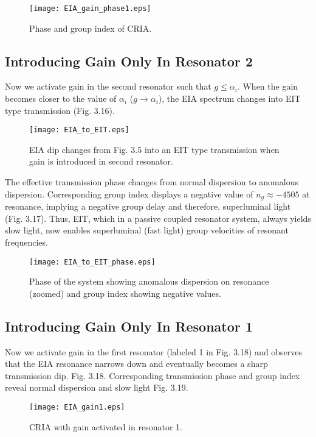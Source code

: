 \begin{figure}[h]
\centering
\texttt{[image: EIA\_gain\_phase1.eps]}
\caption{Phase and group index of CRIA.}
\end{figure}
  
\subsection{Introducing Gain Only In Resonator 2}
Now we activate gain in the second resonator such that $g \leqslant \alpha_{i}$.  When the gain becomes closer to the value of $\alpha_{i}$ ($g \to \alpha_{i}$), the EIA spectrum changes into EIT type transmission (Fig. 3.16).

\begin{figure}[h]
\centering
\texttt{[image: EIA\_to\_EIT.eps]}
\caption{EIA dip changes from Fig. 3.5 into an EIT type transmission when gain is introduced in second resonator.}
\end{figure}

The effective transmission phase changes from normal dispersion to anomalous dispersion. Corresponding group index displays a negative value of $n_{g} \approx -4505$ at resonance, implying a negative group delay and therefore, superluminal light (Fig. 3.17). Thus, EIT, which in a passive coupled resonator system, always yields slow light, now enables superluminal (fast light) group velocities of resonant frequencies.

\begin{figure}[h]
\centering
\texttt{[image: EIA\_to\_EIT\_phase.eps]}
\caption{Phase of the system showing anomalous dispersion on resonance (zoomed) and group index showing negative values.}
\end{figure}

\subsection{Introducing Gain Only In Resonator 1}
Now we activate gain in the first resonator (labeled 1 in Fig. 3.18) and observes that the EIA resonance narrows down and eventually becomes a sharp transmission dip. Fig. 3.18. Corresponding transmission phase and group index reveal normal dispersion and slow light Fig. 3.19.


\begin{figure}[h]
\centering
\texttt{[image: EIA\_gain1.eps]}
\caption{CRIA with gain activated in resonator 1.}
\end{figure}


